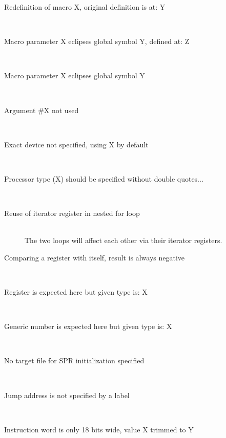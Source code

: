 \begin{description}
        \item[Redefinition of macro X, original definition is at: Y]~\\
        \item[Macro parameter X eclipses global symbol Y, defined at: Z]~\\
        \item[Macro parameter X eclipses global symbol Y]~\\
        \item[Argument \#X not used]~\\
        \item[Exact device not specified, using X by default]~\\
        \item[Processor type (X) should be specified without double quotes...]~\\
        \item[Reuse of iterator register in nested for loop]~\\
            The two loops will affect each other via their iterator registers.
        \item[Comparing a register with itself, result is always negative]~\\
        \item[Register is expected here but given type is: X]~\\
        \item[Generic number is expected here but given type is: X]~\\
        \item[No target file for SPR initialization specified]~\\
        \item[Jump address is not specified by a label]~\\
        \item[Instruction word is only 18 bits wide, value X trimmed to Y]~\\
    \end{description}
